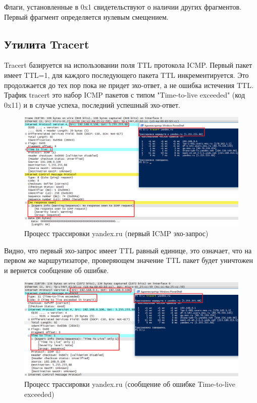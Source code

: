 \documentclass[14pt,a4paper,report]{report}
\begin{document}
Флаги, установленные в 0x1 свидетельствуют о наличии других фрагментов. Первый фрагмент определяется нулевым смещением.

\subsection{Утилита Tracert}

Tracert базируется на использовании поля TTL протокола ICMP. Первый пакет имеет TTL=1, для каждого последующего пакета TTL инкрементируется. Это продолжается до тех пор пока не придет эхо-ответ, а не ошибка истечения TTL. Трафик tracert это набор ICMP пакетов с типом "Time-to-live exceeded" (код 0x11) и в случае успеха, последний успешный эхо-ответ.

\begin{figure}[h!]
	\centering
	\includegraphics[scale = 0.62]{images/tracert1.png}
	
	\caption{Процесс трассировки yandex.ru (первый ICMP эхо-запрос)}
	\label{image:6}
\end{figure}

Видно, что первый эхо-запрос имеет TTL равный единице, это означает, что на первом же маршрутизаторе, проверяющем значение TTL пакет будет уничтожен и вернется сообщение об ошибке.

\begin{figure}[h!]
	\centering
	\includegraphics[scale = 0.62]{images/tracert2.png}
	
	\caption{Процесс трассировки yandex.ru (сообщение об ошибке Time-to-live exceeded)}
	\label{image:7}
\end{figure}
\end{document}
